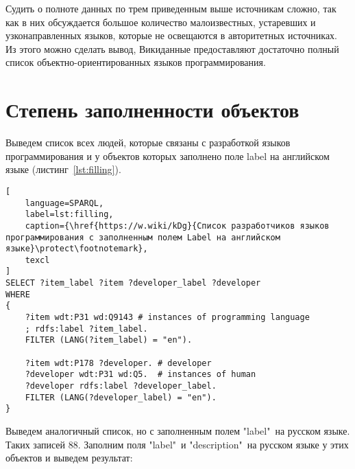 Судить о полноте данных по трем приведенным выше источникам сложно, так как в них обсуждается большое количество малоизвестных, устаревших и узконаправленных языков, которые не освещаются в авторитетных источниках. Из этого можно сделать вывод, Викиданные предоставляют достаточно полный список объектно-ориентированных языков программирования.

\section{Степень заполненности объектов}

\label{question:prog_lang_3}

Выведем список всех людей, которые связаны с разработкой языков программирования и у объектов которых заполнено поле label  на английском языке (листинг~\ref{lst:filling}).

\begin{lstlisting}[
	language=SPARQL,
	label=lst:filling,
	caption={\href{https://w.wiki/kDg}{Список разработчиков языков программирования с заполненным полем Label на английском языке}\protect\footnotemark},
	texcl
]
SELECT ?item_label ?item ?developer_label ?developer
WHERE
{
    ?item wdt:P31 wd:Q9143 # instances of programming language
    ; rdfs:label ?item_label. 
    FILTER (LANG(?item_label) = "en"). 

    ?item wdt:P178 ?developer. # developer 
    ?developer wdt:P31 wd:Q5.  # instances of human
    ?developer rdfs:label ?developer_label. 
    FILTER (LANG(?developer_label) = "en").  
}
\end{lstlisting}
Выведем аналогичный список, но с заполненным полем "label"\  на русском языке. Таких записей 88. Заполним поля "label"\  и "description"\  на русском языке у этих объектов и выведем результат:

